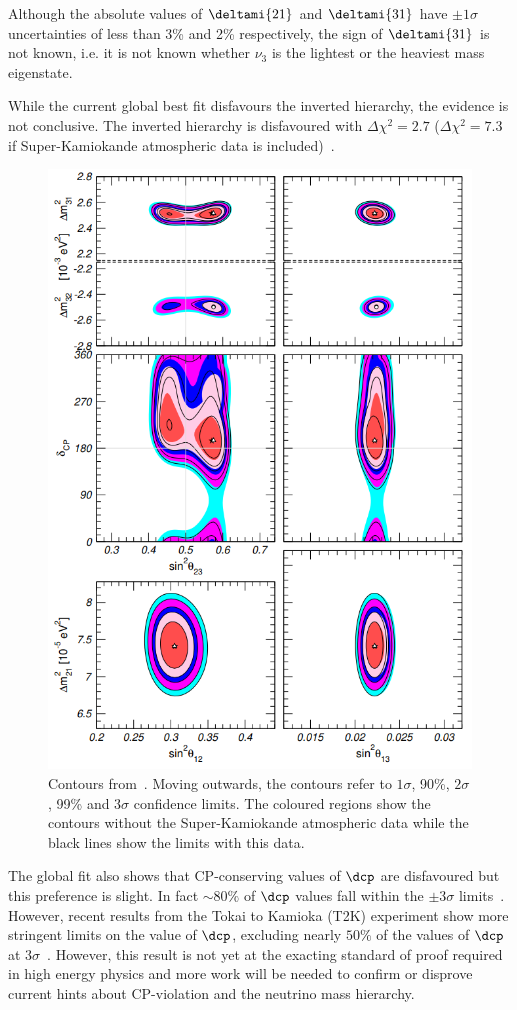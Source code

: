 Although the absolute values of $\deltami{21}$ and $\deltami{31}$ have $\pm1\sigma$ uncertainties of less than 3\% and 2\% respectively, the sign of $\deltami{31}$ is not known, i.e. it is not known whether $\nu_{3}$ is the lightest or the heaviest mass eigenstate.

While the current global best fit disfavours the inverted hierarchy, the evidence is not conclusive.
The inverted hierarchy is disfavoured with $\Delta \chi^{2}=2.7$ ($\Delta \chi^{2}=7.3$ if Super-Kamiokande atmospheric data is included)~\cite{nufit5}.

\begin{figure}[h]
  \centering
  \includegraphics[width=.75\linewidth]{files/figures/theory/nufit5Contours}
  \caption[Global 2-dimensional limits on oscillation parameters.]{Contours from~\cite{nufit5}. Moving outwards, the contours refer to $1\sigma$, 90\%, $2\sigma$, 99\% and $3\sigma$ confidence limits. The coloured regions show the contours without the Super-Kamiokande atmospheric data while the black lines show the limits with this data.}
  \label{fig:nufit5Contours}
\end{figure}

The global fit also shows that CP-conserving values of $\dcp$ are disfavoured but this preference is slight.
In fact $\sim80\%$ of $\dcp$ values fall within the $\pm3\sigma$ limits~\cite{nufit5}.
However, recent results from the Tokai to Kamioka (T2K) experiment show more stringent limits on the value of $\dcp$, excluding nearly $50\%$ of the values of $\dcp$ at $3\sigma$~\cite{t2kRecent}.
However, this result is not yet at the exacting standard of proof required in high energy physics and more work will be needed to confirm or disprove current hints about CP-violation and the neutrino mass hierarchy.


